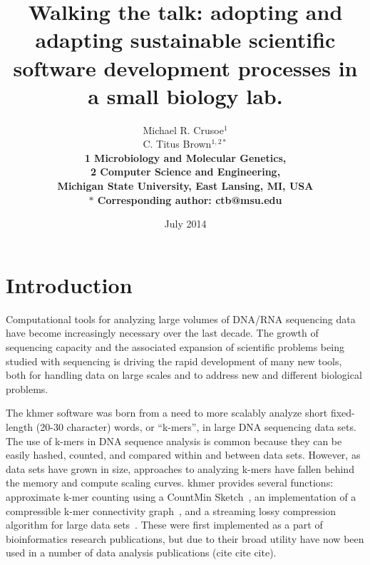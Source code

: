 \documentclass[12pt]{article}
\date{July 2014}
\title{Walking the talk: adopting and adapting sustainable scientific software
  development processes in a small biology lab.}
\author{Michael R. Crusoe$^{1}$\\
C. Titus Brown$^{1,2\ast}$\\
\small \bf{1} Microbiology and Molecular Genetics,\\
\small \bf{2} Computer Science and Engineering,\\
\small Michigan State University, East Lansing, MI, USA\\
\small $\ast$ Corresponding author: ctb@msu.edu}
\begin{document}
\maketitle
\thispagestyle{firststyle}


\setlength{\parindent}{0pt}
\setlength{\parskip}{0.70ex}

\section{Introduction}
Computational tools for analyzing large volumes of DNA/RNA sequencing data
have become increasingly necessary over the last decade.  The growth
of sequencing capacity and the associated expansion of scientific
problems being studied with sequencing is driving the rapid development of
many new tools, both for handling data on large scales and to address
new and different biological problems.

The khmer software was born from a need to more scalably analyze short
fixed-length (20-30 character) words, or ``k-mers'', in large DNA
sequencing data sets. The use of k-mers in DNA sequence analysis is
common because they can be easily hashed, counted, and compared within
and between data sets. However, as data sets have grown in size,
approaches to analyzing k-mers have fallen behind the memory and
compute scaling curves. khmer provides several functions: approximate
k-mer counting using a CountMin Sketch~\cite{Zhang2014}, an
implementation of a compressible k-mer connectivity
graph~\cite{Pell2012}, and a streaming lossy compression algorithm for
large data sets~\cite{diginorm}.  These were first implemented as a
part of bioinformatics research publications, but due to their broad
utility have now been used in a number of data analysis publications
(cite cite cite).
\end{document}
